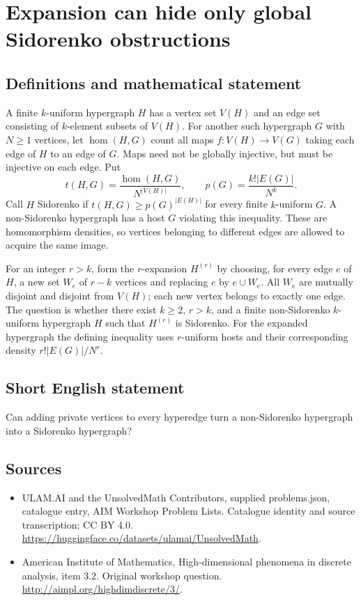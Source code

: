 \documentclass[11pt,a4paper]{article}
\begin{document}
\section*{Expansion can hide only global Sidorenko obstructions}\label{statement}

\subsection{Definitions and mathematical statement}
A finite $k$-uniform hypergraph $H$ has a vertex set $V(H)$ and an edge
set consisting of $k$-element subsets of $V(H)$. For another such
hypergraph $G$ with $N\ge1$ vertices, let $\operatorname{hom}(H,G)$ count
all maps $f:V(H)\to V(G)$ taking each edge of $H$ to an edge of $G$.
Maps need not be globally injective, but must be injective on each edge.
Put
\[
 t(H,G)=\frac{\operatorname{hom}(H,G)}{N^{|V(H)|}},\qquad
 p(G)=\frac{k!|E(G)|}{N^k}.
\]
Call $H$ Sidorenko if $t(H,G)\ge p(G)^{|E(H)|}$ for every finite
$k$-uniform $G$. A non-Sidorenko hypergraph has a host $G$ violating this
inequality. These are homomorphism densities, so vertices belonging to
different edges are allowed to acquire the same image.

For an integer $r>k$, form the $r$-expansion $H^{(r)}$ by choosing,
for every edge $e$ of $H$, a new set $W_e$ of $r-k$ vertices and replacing
$e$ by $e\cup W_e$. All $W_e$ are mutually disjoint and disjoint from
$V(H)$; each new vertex belongs to exactly one edge.
The question is whether there exist $k\ge2$, $r>k$, and a finite
non-Sidorenko $k$-uniform hypergraph $H$ such that $H^{(r)}$ is Sidorenko.
For the expanded hypergraph the defining inequality uses $r$-uniform
hosts and their corresponding density $r!|E(G)|/N^r$.
\subsection{Short English statement}
Can adding private vertices to every hyperedge turn a non-Sidorenko hypergraph into a Sidorenko hypergraph?
\subsection{Sources}
\begin{itemize}
\item[S1] ULAM.AI and the UnsolvedMath Contributors, supplied problems.json, catalogue entry, AIM Workshop Problem Lists. Catalogue identity and source transcription; CC BY 4.0.
\url{https://huggingface.co/datasets/ulamai/UnsolvedMath}.
\item[S2] American Institute of Mathematics, High-dimensional phenomena in discrete analysis, item 3.2. Original workshop question.
\url{http://aimpl.org/highdimdiscrete/3/}.
\end{itemize}
\end{document}
